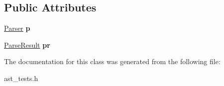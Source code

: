 \subsection*{Public Attributes}
\begin{DoxyCompactItemize}
\item 
\hypertarget{classAstTestSuite_a148a26ab78abac732d857d7095f6dea5}{\hyperlink{classParser}{Parser} {\bfseries p}}\label{classAstTestSuite_a148a26ab78abac732d857d7095f6dea5}

\item 
\hypertarget{classAstTestSuite_ab27964f1743a2889538ca27e644eb1aa}{\hyperlink{classParseResult}{Parse\-Result} {\bfseries pr}}\label{classAstTestSuite_ab27964f1743a2889538ca27e644eb1aa}

\end{DoxyCompactItemize}


The documentation for this class was generated from the following file\-:\begin{DoxyCompactItemize}
\item 
ast\-\_\-tests.\-h\end{DoxyCompactItemize}
